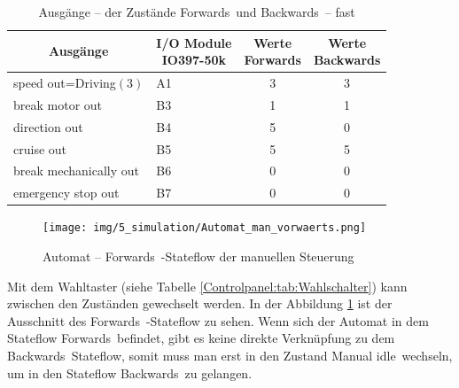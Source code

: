 \pagebreak[1]
\begin{table}[!ht]
	\centering
	\caption{Ausgänge – der Zustände \frqq Forwards\flqq\ und \frqq Backwards\flqq\ –  \frqq fast\flqq}
	\label{Automat_man:tab:z_V_schnell}
	\begin{tabular}{cccc}
		\hline
		\textbf{Ausgänge}                           & \makecell{\textbf{I/O Module}         \\ \textbf{IO397-50k}}    & \makecell{\textbf{Werte}     \\ \textbf{\frqq Forwards\flqq}} & \makecell{\textbf{Werte}     \\ \textbf{\frqq Backwards\flqq}} \\ \hline
		\multicolumn{1}{l|}{speed out=Driving$(3)$} & \multicolumn{1}{l|}{A1}       & 3 & 3 \\
		\multicolumn{1}{l|}{break motor out}        & \multicolumn{1}{l|}{B3}       & 1 & 1 \\
		\multicolumn{1}{l|}{direction out}          & \multicolumn{1}{l|}{B4}       & 5 & 0 \\
		\multicolumn{1}{l|}{cruise out}             & \multicolumn{1}{l|}{B5}       & 5 & 5 \\
		\multicolumn{1}{l|}{break mechanically out} & \multicolumn{1}{l|}{B6}       & 0 & 0 \\
		\multicolumn{1}{l|}{emergency stop out}     & \multicolumn{1}{l|}{B7}       & 0 & 0 \\ \hline
	\end{tabular}
\end{table}
\pagebreak[1]

\pagebreak[1]
\begin{figure}[!ht]
	\begin{center}
		\texttt{[image: img/5\_simulation/Automat\_man\_vorwaerts.png]}
		\caption{Automat – \frqq Forwards\flqq\ -Stateflow der manuellen Steuerung}
		\label{Automat_man:img:man_vorwärts}
	\end{center}
\end{figure}
\pagebreak[1]



Mit dem Wahltaster (siehe Tabelle \ref{Controlpanel:tab:Wahlschalter}) kann zwischen den Zuständen gewechselt werden. In der Abbildung \ref{Automat_man:img:man_vorwärts} ist der Ausschnitt des \frqq Forwards\flqq\ -Stateflow zu sehen. Wenn sich der Automat in dem Stateflow \frqq Forwards\flqq\ befindet, gibt es keine direkte Verknüpfung zu dem \frqq Backwards\flqq\ Stateflow, somit muss man erst in den Zustand \frqq Manual idle\flqq\ wechseln, um in den Stateflow \frqq Backwards\flqq\ zu gelangen.


